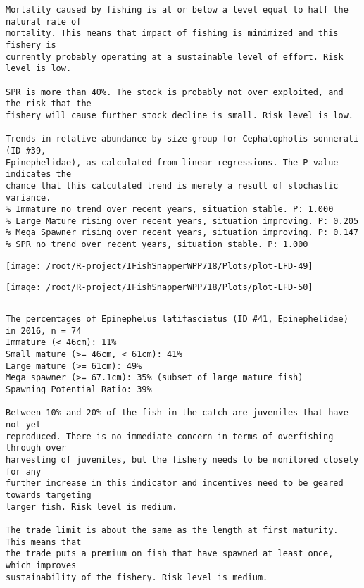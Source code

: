 \documentclass{report}\usepackage[]{graphicx}\usepackage[]{color}
\makeatletter
\def\maxwidth{ %
  \ifdim\Gin@nat@width>\linewidth
    \linewidth
  \else
    \Gin@nat@width
  \fi
}
\newenvironment{kframe}{%
 \def\at@end@of@kframe{}%
 \ifinner\ifhmode%
  \def\at@end@of@kframe{\end{minipage}}%
  \begin{minipage}{\columnwidth}%
 \fi\fi%
 \def\FrameCommand##1{\hskip\@totalleftmargin \hskip-\fboxsep
 \colorbox{shadecolor}{##1}\hskip-\fboxsep
     \hskip-\linewidth \hskip-\@totalleftmargin \hskip\columnwidth}%
 \MakeFramed {\advance\hsize-\width
   \@totalleftmargin\z@ \linewidth\hsize
   \@setminipage}}%
 {\par\unskip\endMakeFramed%
 \at@end@of@kframe}
\newenvironment{knitrout}{}{} %
\makeatother
\begin{document}
\begin{knitrout}
\begin{kframe}
\begin{verbatim}
Mortality caused by fishing is at or below a level equal to half the natural rate of
mortality. This means that impact of fishing is minimized and this fishery is
currently probably operating at a sustainable level of effort. Risk level is low.
 
SPR is more than 40%. The stock is probably not over exploited, and the risk that the
fishery will cause further stock decline is small. Risk level is low.
 
Trends in relative abundance by size group for Cephalopholis sonnerati (ID #39,
Epinephelidae), as calculated from linear regressions. The P value indicates the
chance that this calculated trend is merely a result of stochastic variance.
% Immature no trend over recent years, situation stable. P: 1.000
% Large Mature rising over recent years, situation improving. P: 0.205
% Mega Spawner rising over recent years, situation improving. P: 0.147
% SPR no trend over recent years, situation stable. P: 1.000
\end{verbatim}
\end{kframe}
\texttt{[image: /root/R-project/IFishSnapperWPP718/Plots/plot-LFD-49]} 

\texttt{[image: /root/R-project/IFishSnapperWPP718/Plots/plot-LFD-50]} 
\begin{kframe}\begin{verbatim}
\end{verbatim}
\end{kframe}
\clearpage
\newpage
\begin{kframe}\begin{verbatim}The percentages of Epinephelus latifasciatus (ID #41, Epinephelidae) in 2016, n = 74
Immature (< 46cm): 11%
Small mature (>= 46cm, < 61cm): 41%
Large mature (>= 61cm): 49%
Mega spawner (>= 67.1cm): 35% (subset of large mature fish)
Spawning Potential Ratio: 39%
 
Between 10% and 20% of the fish in the catch are juveniles that have not yet
reproduced. There is no immediate concern in terms of overfishing through over
harvesting of juveniles, but the fishery needs to be monitored closely for any
further increase in this indicator and incentives need to be geared towards targeting
larger fish. Risk level is medium.

The trade limit is about the same as the length at first maturity.  This means that
the trade puts a premium on fish that have spawned at least once, which improves
sustainability of the fishery. Risk level is medium.


\end{verbatim}
\end{kframe}
\end{knitrout}
\end{document}
